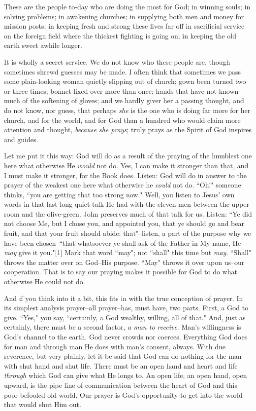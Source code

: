 These are the people to-day who are doing the most for God; in winning
souls; in solving problems; in awakening churches; in supplying both men
and money for mission posts; in keeping fresh and strong these lives far
off in sacrificial service on the foreign field where the thickest
fighting is going on; in keeping the old earth sweet awhile longer.

It is wholly a secret service. We do not know who these people are, though
sometimes shrewd guesses may be made. I often think that sometimes we pass
some plain-looking woman quietly slipping out of church; gown been turned
two or three times; bonnet fixed over more than once; hands that have not
known much of the softening of gloves; and we hardly giver her a passing
thought, and do not know, nor guess, that perhaps \textit{she} is the one who is
doing far more for her church, and for the world, and for God than a
hundred who would claim more attention and thought, \textit{because she prays};
truly prays as the Spirit of God inspires and guides.

Let me put it this way: God will do as a result of the praying of the
humblest one here what otherwise He \textit{would} not do. Yes, I can make it
stronger than that, and I must make it stronger, for the Book does.
Listen: God will do in answer to the prayer of the weakest one here what
otherwise he \textit{could} not do. ``Oh!" someone thinks, ``you are getting that
too strong now." Well, you listen to Jesus' own words in that last long
quiet talk He had with the eleven men between the upper room and the
olive-green. John preserves much of that talk for us. Listen: ``Ye did not
choose Me, but I chose you, and appointed you, that ye should go and bear
fruit, and that your fruit should abide: that"--listen, a part of the
purpose why we have been chosen--``that whatsoever ye shall ask of the
Father in My name, He \textit{may} give it you."[1] Mark that word ``may"; not
``shall" this time but \textit{may}. ``Shall" throws the matter over on God--His
purpose. ``May" throws it over upon us--our cooperation. That is to say our
praying makes it possible for God to do what otherwise He could not do.

And if you think into it a bit, this fits in with the true conception of
prayer. In its simplest analysis prayer--all prayer--has, must have, two
parts. First, a God to give. ``Yes," you say, ``certainly, a God wealthy,
willing, all of that." And, just as certainly, there must be a second
factor, \textit{a man to receive}. Man's willingness is God's channel to the
earth. God never crowds nor coerces. Everything God does for man and
through man He does with man's consent, always. With due reverence, but
very plainly, let it be said that God can do nothing for the man with shut
hand and shut life. There must be an open hand and heart and life
\textit{through} which God can give what He longs to. An open life, an open hand,
open upward, is the pipe line of communication between the heart of God
and this poor befooled old world. Our prayer is God's opportunity to get
into the world that would shut Him out.



